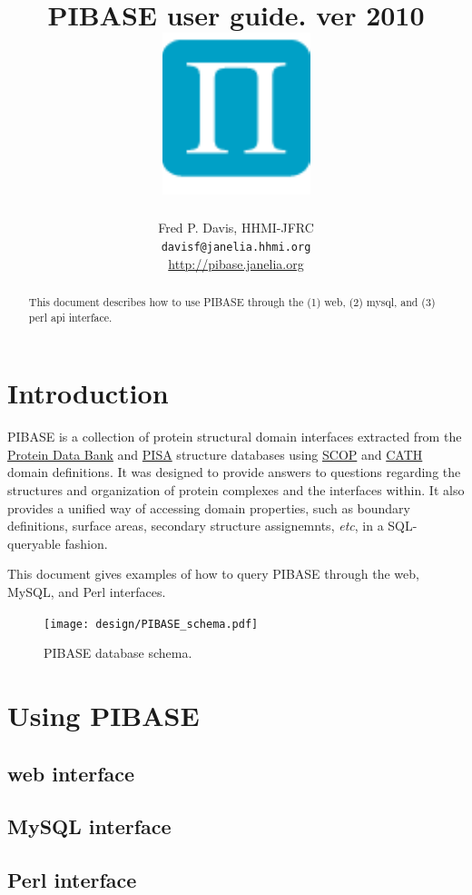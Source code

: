 \documentclass[11pt]{article}
\title{PIBASE user guide. ver 2010\\
\includegraphics[scale=0.5]{pibase_blue_web.pdf}}
\author{Fred P. Davis, HHMI-JFRC\\{\tt davisf@janelia.hhmi.org}\\\url{http://pibase.janelia.org}}
\begin{document}
\maketitle

\begin{abstract}
This document describes how to use PIBASE through the (1) web, (2) mysql, and (3) perl api interface.
\end{abstract}

\section{Introduction}
PIBASE is a collection of protein structural domain interfaces extracted from the \href{http://www.rcsb.org/pdb}{Protein Data Bank} and \href{http://www.ebi.ac.uk/msd-srv/prot_int/pistart.html}{PISA} structure databases using \href{http://scop.mrc-lmb.cam.ac.uk/scop/}{SCOP} and \href{http://www.biochem.ucl.ac.uk/bsm/cath/}{CATH} domain definitions. It was designed to provide answers to questions regarding the structures and organization of protein complexes and the interfaces within. It also  provides a unified way of accessing domain properties, such as boundary definitions, surface areas, secondary structure assignemnts, {\it etc}, in a SQL-queryable fashion.

This document gives examples of how to query PIBASE through the web, MySQL, and Perl interfaces.

\begin{figure}
\texttt{[image: design/PIBASE\_schema.pdf]}
\caption{PIBASE database schema.}
\end{figure}

\section{Using PIBASE}

\subsection{web interface}

\subsection{MySQL interface}

\subsection{Perl interface}
\end{document}
